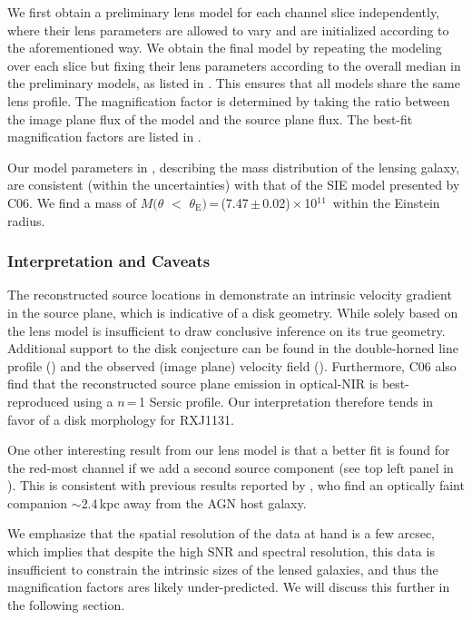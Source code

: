 \documentclass[]{emulateapj}
\begin{document}
We first obtain a preliminary lens model for each channel slice independently,
where their lens parameters are allowed to vary and are initialized according
to the aforementioned way. We obtain the final model
by repeating the modeling over each slice but fixing their lens parameters
according to the overall median in the preliminary models, as listed in .
This ensures that all models share the same lens profile.
The magnification factor is determined by taking the ratio
between the image plane flux of the model and the source plane flux.
The best-fit magnification factors are listed in .

Our model parameters in , describing
the mass distribution of the lensing galaxy, are consistent (within the uncertainties)
with that of the SIE model presented by C06. We find a mass of
$M(\theta$\,\,$<$\,\,$\theta_\textrm{E})$\,=\,(7.47\,$\pm$\,0.02)\,$\times$\,10$^{11}$\,\Msun
within the Einstein radius.



\subsubsection{Interpretation and Caveats} \label{sec:caveat} %
The reconstructed source locations in  demonstrate
an intrinsic velocity gradient in the source plane, which is
indicative of a disk geometry. While solely based on the
lens model is insufficient to draw conclusive inference on its
true geometry. Additional support to the disk conjecture %
can be found in the double-horned line profile ()
and the observed (image plane) velocity field (). Furthermore,
C06 also find that the reconstructed source plane emission in optical-NIR
is best-reproduced using a $n$\,=\,1 Sersic profile.
Our interpretation therefore tends in favor of a disk morphology for RXJ1131.

One other interesting result from our lens model is that a better fit is
found for the red-most channel if we add a second source component (see
top left panel in ). This is consistent with previous results
reported by \citet{Brewer08a}, who find an optically faint companion
$\sim$2.4\,kpc away from the AGN host galaxy.

We emphasize that the spatial resolution of the data at hand
is a few arcsec, which implies that despite the high SNR and spectral
resolution, this data is insufficient to constrain the
intrinsic sizes of the lensed galaxies, and thus the magnification
factors ares likely under-predicted.
We will discuss this further in the following section. %
\end{document}
